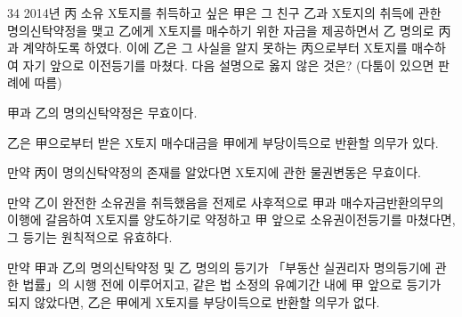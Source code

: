 \begin{question}{34}
2014년 丙 소유 X토지를 취득하고 싶은 甲은 그 친구 乙과 X토지의 취득에 관한 명의신탁약정을 맺고 乙에게 X토지를 매수하기 위한 자금을 제공하면서 乙 명의로 丙과 계약하도록 하였다. 이에 乙은 그 사실을 알지 못하는 丙으로부터 X토지를 매수하여 자기 앞으로 이전등기를 마쳤다. 다음 설명으로 옳지 않은 것은? (다툼이 있으면 판례에 따름)
\begin{choices}
  \item 甲과 乙의 명의신탁약정은 무효이다.
  \item 乙은 甲으로부터 받은 X토지 매수대금을 甲에게 부당이득으로 반환할 의무가 있다.
  \item 만약 丙이 명의신탁약정의 존재를 알았다면 X토지에 관한 물권변동은 무효이다.
  \item 만약 乙이 완전한 소유권을 취득했음을 전제로 사후적으로 甲과 매수자금반환의무의 이행에 갈음하여 X토지를 양도하기로 약정하고 甲 앞으로 소유권이전등기를 마쳤다면, 그 등기는 원칙적으로 유효하다.
  \item 만약 甲과 乙의 명의신탁약정 및 乙 명의의 등기가 「부동산 실권리자 명의등기에 관한 법률」의 시행 전에 이루어지고, 같은 법 소정의 유예기간 내에 甲 앞으로 등기가 되지 않았다면, 乙은 甲에게 X토지를 부당이득으로 반환할 의무가 없다.
\end{choices}
\end{question}
